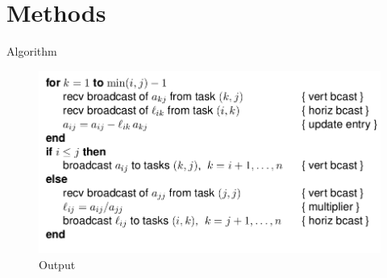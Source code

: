 \documentclass{beamer}
\begin{document}
\section{Methods}
\begin{frame}{Algorithm}
\begin{center}
\begin{figure}[htp]
\centering
\includegraphics[scale=.4]{pic1.png}
\caption{Output}
\end{figure}
\end{center}
\end{frame}
\end{document}
